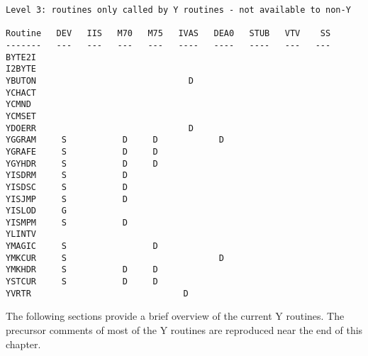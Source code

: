 \begin{verbatim}
Level 3: routines only called by Y routines - not available to non-Y

Routine   DEV   IIS   M70   M75   IVAS   DEA0   STUB   VTV    SS
-------   ---   ---   ---   ---   ----   ----   ----   ---   ---
BYTE2I                                      
I2BYTE                                      
YBUTON                              D
YCHACT                                      
YCMND                                       
YCMSET                                      
YDOERR                              D
YGGRAM     S           D     D            D
YGRAFE     S           D     D
YGYHDR     S           D     D
YISDRM     S           D
YISDSC     S           D
YISJMP     S           D
YISLOD     G
YISMPM     S           D
YLINTV                                      
YMAGIC     S                 D
YMKCUR     S                              D
YMKHDR     S           D     D
YSTCUR     S           D     D
YVRTR                              D

\end{verbatim}
The following sections provide a brief overview of the current Y
routines.  The precursor comments of most of the Y routines are
reproduced near the end of this chapter.
